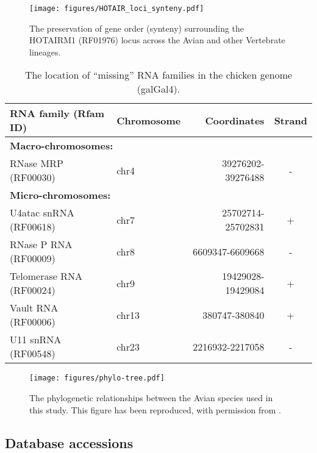 \documentclass[10pt]{bmc_article}
\newenvironment{bmcformat}{\begin{raggedright}\baselineskip20pt\sloppy\setboolean{publ}{false}}{\end{raggedright}\baselineskip20pt\sloppy}
\begin{document}
\begin{bmcformat}
\begin{figure}[ht]
\texttt{[image: figures/HOTAIR\_loci\_synteny.pdf]}
  \caption[]{The preservation of gene order (synteny) surrounding the
    HOTAIRM1 (RF01976) locus across the Avian and other Vertebrate
    lineages.}\label{fig:16}
\end{figure}

\clearpage
\newpage

\begin{table}[h!]
  \begin{center}
    \begin{tabular}{|l|l|r|c|}
    \hline
RNA family (Rfam ID) & Chromosome & Coordinates & Strand \\
    \hline
\multicolumn{4}{|l|}{{\bf Macro-chromosomes:}}\\
RNase MRP (RF00030)     & chr4 & 39276202-39276488 & -\\
\multicolumn{4}{|l|}{{\bf Micro-chromosomes:}}\\ 
U4atac snRNA (RF00618)  & chr7 &	25702714-25702831 & +\\
RNase P RNA (RF00009)   & chr8 & 6609347-6609668   & -\\
Telomerase RNA (RF00024)& chr9 & 19429028-19429084 & +\\
Vault RNA (RF00006)     & chr13& 380747-380840     & +\\
U11 snRNA (RF00548)     & chr23& 2216932-2217058   & -\\
\hline
    \end{tabular}
  \end{center}
  \caption{The location of ``missing'' RNA families in the chicken genome (galGal4). }
\end{table}


\clearpage
\newpage

\begin{figure}[ht]
\texttt{[image: figures/phylo-tree.pdf]}
  \caption[]{The phylogenetic relationships between the Avian species
    used in this study. This figure has been reproduced, with permission from \cite{birds:14a}.}\label{fig:17}
\end{figure}



\clearpage
\newpage


\subsection*{Database accessions}


\end{bmcformat}
\end{document}
